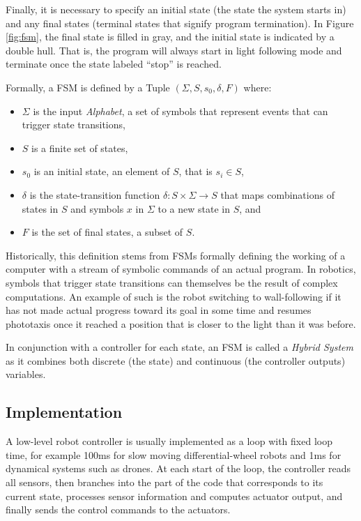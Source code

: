 Finally, it is necessary to specify an initial state (the state the system starts in) and any final states (terminal states that signify program termination). In Figure \ref{fig:fsm}, the final state is filled in gray, and the initial state is indicated by a double hull. That is, the program will always start in light following mode and terminate once the state labeled ``stop'' is reached. 


Formally, a FSM is defined by a Tuple $(\Sigma, S, s_0, \delta, F)$ where:
\begin{itemize}
\item $\Sigma$ is the input \emph{Alphabet}, a set of symbols that represent events that can trigger state transitions,
\item $S$ is a finite set of states,
\item $s_0$ is an initial state, an element of $S$, that is $s_i \in S$,
\item $\delta$ is the state-transition function $\delta: S \times \Sigma \rightarrow S$ that maps combinations of states in $S$ and symbols $x$ in $\Sigma$ to a new state in $S$, and
\item $F$ is the set of final states, a subset of $S$.
\end{itemize}

Historically, this definition stems from FSMs formally defining the working of a computer with a stream of symbolic commands of an actual program. In robotics, symbols that trigger state transitions can themselves be the result of complex computations. An example of such is the robot switching to wall-following if it has not made actual progress toward its goal in some time and resumes phototaxis once it reached a position that is closer to the light than it was before.

In conjunction with a controller for each state, an FSM is called a \emph{Hybrid System}\cite{van2000introduction} as it combines both discrete (the state) and continuous (the controller outputs) variables.

\subsection{Implementation}
A low-level robot controller is usually implemented as a loop with fixed loop time, for example 100ms for slow moving differential-wheel robots and 1ms for dynamical systems such as drones. At each start of the loop, the controller reads all sensors, then branches into the part of the code that corresponds to its current state, processes sensor information and computes actuator output, and finally sends the control commands to the actuators.

